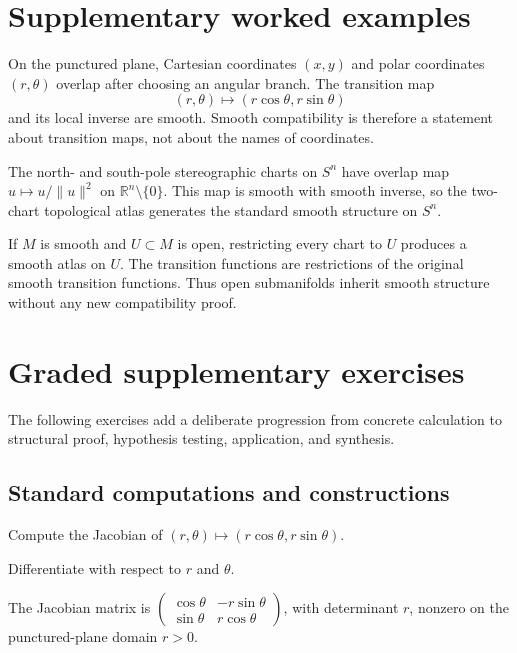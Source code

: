 \section{Supplementary worked examples}
\label{sec:vii02-pedagogy}

\begin{example}\label{ex:vii02-ped-01}
On the punctured plane, Cartesian coordinates \((x,y)\) and polar coordinates \((r,\theta)\) overlap after choosing an angular branch.  The transition map
\[
(r,\theta)\longmapsto (r\cos\theta,r\sin\theta)
\]
and its local inverse are smooth.  Smooth compatibility is therefore a statement about transition maps, not about the names of coordinates.
\end{example}

\begin{example}\label{ex:vii02-ped-02}
The north- and south-pole stereographic charts on \(S^n\) have overlap map \(u\mapsto u/\lVert u\rVert^2\) on \(\mathbb R^n\setminus\{0\}\).  This map is smooth with smooth inverse, so the two-chart topological atlas generates the standard smooth structure on \(S^n\).
\end{example}

\begin{example}\label{ex:vii02-ped-03}
If \(M\) is smooth and \(U\subset M\) is open, restricting every chart to \(U\) produces a smooth atlas on \(U\).  The transition functions are restrictions of the original smooth transition functions.  Thus open submanifolds inherit smooth structure without any new compatibility proof.
\end{example}

\section{Graded supplementary exercises}
The following exercises add a deliberate progression from concrete calculation to structural proof, hypothesis testing, application, and synthesis.

\subsection*{Standard computations and constructions}

\begin{exercise}\label{exr:vii02-ped-01}
Compute the Jacobian of \((r,\theta)\mapsto(r\cos\theta,r\sin\theta)\).
\end{exercise}
\begin{hint}
Differentiate with respect to \(r\) and \(\theta\).
\end{hint}
\begin{solution}
The Jacobian matrix is \(\begin{pmatrix}\cos\theta&-r\sin\theta\\ \sin\theta&r\cos\theta\end{pmatrix}\), with determinant \(r\), nonzero on the punctured-plane domain \(r>0\).
\end{solution}

